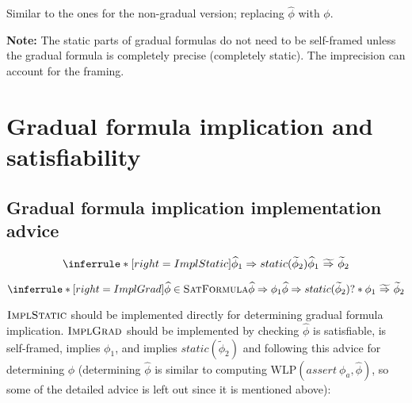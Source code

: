 \documentclass {article}
\newcommand{\fphi}{\widehat{\phi}}
\newcommand{\tphi}{\widetilde{\phi}}
\newcommand{\imp}{\Rightarrow}
\newcommand{\timp}{\ \widetilde{\Rightarrow}\ }
\newcommand{\wlp}[2]{\text{WLP}(#1,#2)}
\newcommand{\twlp}[2]{\widetilde{\text{WLP}}(#1,#2)}
\newcommand{\satdef}{\textsc{SatFormula}}
\newcommand{\implsdef}{\textsc{ImplStatic}}
\newcommand{\implgdef}{\textsc{ImplGrad}}
\begin{document}
Similar to the ones for the non-gradual version; replacing $\fphi$ with $\phi$.

\vspace{0.5cm}
%
%
%
%

\textbf{Note:} The static parts of gradual formulas do not need to be self-framed unless the gradual formula is completely precise (completely static). The imprecision can account for the framing.

\section{Gradual formula implication and satisfiability}

\subsection{Gradual formula implication implementation advice}

\[ \inferrule*[right=ImplStatic]
   {\fphi_1 \imp static(\tphi_2) }
   {\fphi_1 \timp \tphi_2}
\]

\[
\inferrule*[right=ImplGrad]
   {\fphi \in \satdef \\ \fphi \imp \phi_1 \\ \fphi \imp static(\tphi_2)}
   {? \ast \phi_1 \timp \tphi_2}
\]

$\implsdef$ should be implemented directly for determining gradual formula implication. $\implgdef$ should be implemented by checking $\fphi$ is satisfiable, is self-framed, implies $\phi_1$, and implies $static(\tphi_2)$ and following this advice for determining $\fphi$ (determining $\fphi$ is similar to computing $\wlp{assert\ \phi_a}{\fphi}$, so some of the detailed advice is left out since it is mentioned above):
\end{document}
